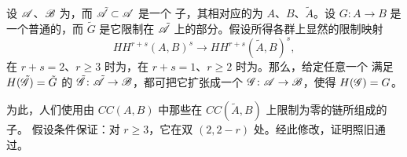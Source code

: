 \begin{lemma}\label{thm:relative-functor-extension}
设 $\mathscr{A}$、$\mathscr{B}$ 为\trNonunital{}\trACategory，而 $\tilde{\mathscr{A}}\subset\mathscr{A}$ 是一个%
\trFull{}子\trCategory，其相对应的\trCohomology\trCategory{}为 $A$、$B$、$\tilde{A}$。设
$G\colon A\to B$ 是一个普通的\trNonunital\trFunctor，而 $\tilde{G}$ 是它限制在
$\tilde{\mathscr{A}}$ 上的部分。假设所得各\trHochschildCohomology{}群上显然的限制映射
\begin{equation*}
HH^{r+s}(A,B)^s\longrightarrow HH^{r+s}(\tilde{A},B)^s,
\end{equation*}
在 $r+s=2$、$r\ge 3$ 时为\trInjective，在 $r+s=1$、$r\ge 2$ 时为\trSurjective。那么，给定任意一个%
满足 $H(\tilde{\mathscr{G}})=\tilde{G}$ 的\trNonunital{}\trAFunctor{}%
$\tilde{\mathscr{G}}\colon\tilde{\mathscr{A}}\to\mathscr{B}$，都可把它扩张成一个
$\mathscr{G}\colon\mathscr{A}\to\mathscr{B}$，使得 $H(\mathscr{G})=G$。
\end{lemma}

为此，人们使用由 $CC(A,B)$ 中那些在 $CC(\tilde{A},B)$ 上限制为零的链所组成的子\trComplex。
假设条件保证：对 $r\ge 3$，它在双\trGraded{} $(2,2-r)$ 处\trAcyclic。经此修改，证明照旧通过。
